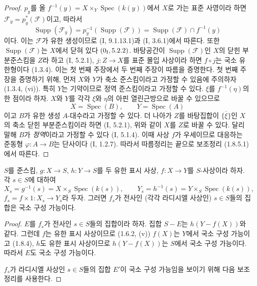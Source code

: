 \begin{proof}
$p_y$를 올
$f^{-1}(y)=X\times_Y\operatorname{Spec}(k(y))$에서 $X$로 가는 표준
사영이라 하면 $\mathscr F_y=p_y^*(\mathscr F)$이고, 따라서
\[
\operatorname{Supp}(\mathscr F_y)
=p_y^{-1}(\operatorname{Supp}(\mathscr F))
=\operatorname{Supp}(\mathscr F)\cap f^{-1}(y)
\]
이다. 이는 $\mathscr F$가 유한 생성이므로 (I, 9.1.13.1)과
(I, 3.6.1)에서 따른다. 또한 $\operatorname{Supp}(\mathscr F)$는
$X$에서 닫혀 있다 $(0\textsubscript{I}, 5.2.2)$. 바탕공간이
$\operatorname{Supp}(\mathscr F)$인 $X$의 닫힌 부분준스킴을 $Z$라
하고 (I, 5.2.1), $j:Z\to X$를 표준 몰입 사상이라 하면 $f\circ j$는
국소 유한형이다 (1.3.4). 이는 첫 번째 주장에서 두 번째 주장이
따름을 증명한다.
첫 번째 주장을 증명하기 위해, 먼저 $X$와 $Y$가 축소 준스킴이라고
가정할 수 있음에 주의하자 (1.3.4, (vi)). 특히 $Y$는 기약이므로
정역 준스킴이라고 가정할 수 있다. $\xi$를 $f^{-1}(\eta)$의 한 점이라
하자. $X$와 $Y$를 각각 $\xi$와 $\eta$의 아핀 열린근방으로 바꿀 수
있으므로
\[
  X=\operatorname{Spec}(B),\qquad Y=\operatorname{Spec}(A)
\]
이고 $B$가 유한 생성 $A$-대수라고 가정할 수 있다. 더 나아가 $Z$를
바탕집합이 $\overline{\{\xi\}}$인 $X$의 축소 닫힌 부분준스킴이라
하면 (I, 5.2.1), 위와 같이 $X$를 $Z$로 바꿀 수 있다. 달리 말해
$B$가 \emph{정역}이라고 가정할 수 있다 (I, 5.1.4). 이때 사상 $f$가
우세이므로 대응하는 준동형 $\varphi:A\to B$는 단사이다 (I, 1.2.7).
따라서 따름정리는 끝으로 보조정리 (1.8.5.1)에서 따른다.
\end{proof}


\begin{proposition}[1.8.7]
\label{IV.1.8.7-fr}
$S$를 준스킴, $g:X\to S$, $h:Y\to S$를 두 유한 표시 사상,
$f:X\to Y$를 $S$-사상이라 하자. 각 $s\in S$에 대하여
\[
  X_s=g^{-1}(s)=X\times_S\operatorname{Spec}(k(s)),\qquad
  Y_s=h^{-1}(s)=Y\times_S\operatorname{Spec}(k(s)),
\]
$f_s=f\times 1:X_s\to Y_s$라 두자. 그러면 $f_s$가 전사인 (각각
라디시엘 사상인) $s\in S$들의 집합은 국소 구성 가능이다.
\end{proposition}

\begin{proof}
$E$를 $f_s$가 전사인 $s\in S$들의 집합이라 하자. 집합 $S-E$는
$h(Y-f(X))$와 같다. 그런데 $f$는 유한 표시 사상이므로 (1.6.2, (v))
$f(X)$는 $Y$에서 국소 구성 가능이고 (1.8.4), $h$도 유한 표시
사상이므로 $h(Y-f(X))$는 $S$에서 국소 구성 가능이다. 따라서 $E$도
국소 구성 가능이다.

$f_s$가 라디시엘 사상인 $s\in S$들의 집합 $E'$이 국소 구성 가능임을
보이기 위해 다음 보조정리를 사용한다.
\end{proof}

